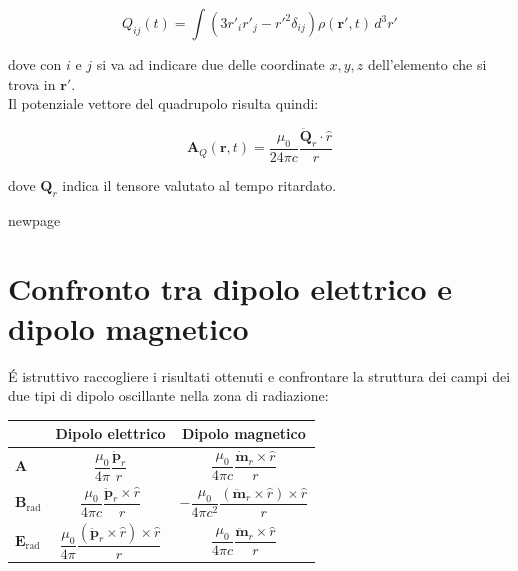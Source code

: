 \begin{tcolorbox}[colback=yellow!10!white, colframe=orange!70!black, 
boxrule=0.8pt]
\begin{equation}
    Q_{ij} (t) = \int \left(3r'_i r'_j - r'^2 \delta_{ij}\right) \rho(\mathbf{r'}, t) \, d^3r'
\end{equation}
\end{tcolorbox}

dove con $i$ e $j$ si va ad indicare due delle coordinate $x, y, z$ dell'elemento che si trova in $\mathbf{r}'$.\\

Il potenziale vettore del quadrupolo risulta quindi:

\begin{tcolorbox}[colback=yellow!10!white, colframe=orange!70!black, boxrule=0.8pt]
\begin{equation} \label{eq: potenziale_quadrupolo}
    \mathbf{A}_{Q}(\mathbf{r}, t) = \frac{\mu_0}{24\pi c} 
    \frac{\ddot{\mathbf{Q}}_r \cdot \hat{r}}{r}
\end{equation}
\end{tcolorbox}

dove $\mathbf{Q}_r$ indica il tensore valutato al tempo ritardato.

newpage

\section{Confronto tra dipolo elettrico e dipolo magnetico}

\'E istruttivo raccogliere i risultati ottenuti e confrontare la struttura dei campi dei due tipi di dipolo oscillante nella zona di radiazione:

\begin{center}
\renewcommand{\arraystretch}{2.4}
\begin{tabular}{lcc}
\hline
& \textbf{Dipolo elettrico} & \textbf{Dipolo magnetico} \\
\hline
$\mathbf{A}$ & 
$\dfrac{\mu_0}{4\pi}\dfrac{\dot{\mathbf{p}}_r}{r}$ & 
$\dfrac{\mu_0}{4\pi c}\dfrac{\dot{\mathbf{m}}_r \times \hat{r}}{r}$ 
\\[4pt]

$\mathbf{B}_\text{rad}$ & 
$\dfrac{\mu_0}{4\pi c}\dfrac{\ddot{\mathbf{p}}_r \times \hat{r}}{r}$ & 
$-\dfrac{\mu_0}{4\pi c^2}
\dfrac{(\ddot{\mathbf{m}}_r \times \hat{r}) \times \hat{r}}{r}$ \\[4pt]

$\mathbf{E}_\text{rad}$ & 
$\dfrac{\mu_0}{4\pi}
\dfrac{(\ddot{\mathbf{p}}_r \times \hat{r}) \times \hat{r}}{r}$ & 
$\dfrac{\mu_0}{4\pi c}\dfrac{\ddot{\mathbf{m}}_r \times \hat{r}}{r}$ \\
\hline
\end{tabular}
\end{center}

